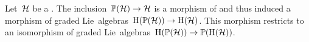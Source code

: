 \documentclass[a4paper,10pt,headings=standardclasses]{scrartcl}
\begin{document}
\begin{theorem}
  Let~$\mathcal{H}$ be a {\dgh}.
  The inclusion~$\mathbb{P}(\mathcal{H}) \to \mathcal{H}$ is a morphism of {\dgls} and thus induced a morphism of graded Lie~algebras~$\operatorname{H}(\mathbb{P}(\mathcal{H})) \to \operatorname{H}(\mathcal{H})$.
  This morphism restricts to an isomorphism of graded Lie~algebras~$\operatorname{H}(\mathbb{P}(\mathcal{H})) \to \mathbb{P}(\operatorname{H}(\mathcal{H}))$.
\end{theorem}%














\printbibliography
\end{document}
